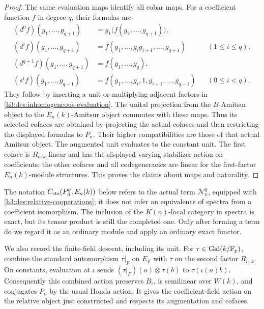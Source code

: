 \begin{proof}
The same evaluation maps identify all cobar maps.  For a coefficient
function \(f\) in degree \(q\), their formulas are
\[
 \begin{aligned}
 (d^0f)(g_1,\ldots,g_{q+1})
     &=g_1\bigl(f(g_2,\ldots,g_{q+1})\bigr),\\
 (d^if)(g_1,\ldots,g_{q+1})
     &=f(g_1,\ldots,g_i g_{i+1},\ldots,g_{q+1})
       &&(1\leq i\leq q),\\
 (d^{q+1}f)(g_1,\ldots,g_{q+1})
     &=f(g_1,\ldots,g_q),\\
 (s^if)(g_1,\ldots,g_{q-1})
     &=f(g_1,\ldots,g_i,1,g_{i+1},\ldots,g_{q-1})
       &&(0\leq i<q).
 \end{aligned}
\]
They follow by inserting a unit or multiplying adjacent factors in
\eqref{h3:des:inhomogeneous-evaluation}.  The unital projection from
the \(B\)-Amitsur object to the \(E_n(k)\)-Amitsur object commutes with
these maps.  Thus its selected cofaces are obtained by projecting the
actual cofaces and then restricting the displayed formulas to \(P_n\).
Their higher compatibilities are those of that actual Amitsur object.
The augmented unit evaluates to the constant unit.  The first coface is
\(R_{n,k}\)-linear and has the displayed varying stabilizer action on
coefficients; the other cofaces and all codegeneracies are linear for
the first-factor \(E_n(k)\)-module structures.  This proves the claims
about maps and naturality.
\end{proof}

The notation \(C_{\mathrm{cts}}(P_n^q,E_n(k))\) below refers to the actual
term \(\mathcal N_n^q\), equipped with
\eqref{h3:des:relative-cooperations}; it does not infer an equivalence
of spectra from a coefficient isomorphism.  The inclusion of the
\(K(n)\)-local category in spectra is exact, but its tensor product is
still the completed one.  Only after forming a term do we regard it as
an ordinary module and apply an ordinary exact functor.

We also record the finite-field descent, including its unit.  For
\(\tau\in\operatorname{Gal}(k/\mathbb F_p)\), combine the standard automorphism
\(\tau|_F\) on \(E_F\) with \(\tau\) on the second factor
\(R_{n,k}\).  On constants, evaluation at \(\iota\) sends
\((\tau|_F)(a)\otimes\tau(b)\) to \(\tau(\iota(a)b)\).
Consequently this combined action preserves \(B_\iota\), is semilinear
over \(W(k)\), and conjugates \(P_n\) by the usual Honda action.
It gives the coefficient-field action on the relative object just
constructed and respects its augmentation and cofaces.

